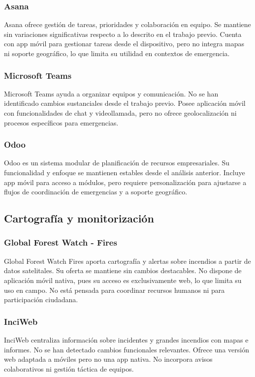 \subsubsection{Asana}
Asana \cite{asana} ofrece gestión de tareas, prioridades y colaboración en equipo. Se mantiene sin variaciones significativas respecto a lo descrito en el trabajo previo. Cuenta con app móvil para gestionar tareas desde el dispositivo, pero no integra mapas ni soporte geográfico, lo que limita su utilidad en contextos de emergencia.

\subsubsection{Microsoft Teams}
Microsoft Teams \cite{microsoft_teams} ayuda a organizar equipos y comunicación. No se han identificado cambios sustanciales desde el trabajo previo. Posee aplicación móvil con funcionalidades de chat y videollamada, pero no ofrece geolocalización ni procesos específicos para emergencias.

\subsubsection{Odoo}
Odoo \cite{odoo} es un sistema modular de planificación de recursos empresariales. Su funcionalidad y enfoque se mantienen estables desde el análisis anterior. Incluye app móvil para acceso a módulos, pero requiere personalización para ajustarse a flujos de coordinación de emergencias y a soporte geográfico.

\subsection{Cartografía y monitorización}

\subsubsection{Global Forest Watch - Fires}
Global Forest Watch Fires \cite{gfw_fires} aporta cartografía y alertas sobre incendios a partir de datos satelitales. Su oferta se mantiene sin cambios destacables. No dispone de aplicación móvil nativa, pues su acceso es exclusivamente web, lo que limita su uso en campo. No está pensada para coordinar recursos humanos ni para participación ciudadana.

\subsubsection{InciWeb}
InciWeb \cite{inciweb} centraliza información sobre incidentes y grandes incendios con mapas e informes. No se han detectado cambios funcionales relevantes. Ofrece una versión web adaptada a móviles pero no una app nativa. No incorpora avisos colaborativos ni gestión táctica de equipos.

